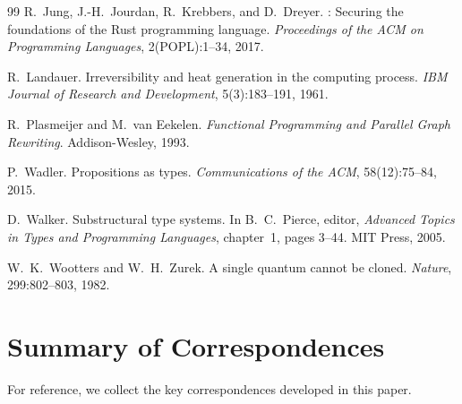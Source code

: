 \documentclass[11pt,a4paper]{article}
\begin{document}
\begin{thebibliography}{99}
R.~Jung, J.-H.~Jourdan, R.~Krebbers, and D.~Dreyer.
: Securing the foundations of the {Rust} programming
  language.
\newblock \emph{Proceedings of the ACM on Programming Languages}, 2(POPL):1--34,
  2017.

R.~Landauer.
\newblock Irreversibility and heat generation in the computing process.
\newblock \emph{IBM Journal of Research and Development}, 5(3):183--191, 1961.

R.~Plasmeijer and M.~van Eekelen.
\newblock \emph{Functional Programming and Parallel Graph Rewriting}.
\newblock Addison-Wesley, 1993.

P.~Wadler.
\newblock Propositions as types.
\newblock \emph{Communications of the ACM}, 58(12):75--84, 2015.

D.~Walker.
\newblock Substructural type systems.
\newblock In B.~C.~Pierce, editor, \emph{Advanced Topics in Types and
  Programming Languages}, chapter~1, pages 3--44. MIT Press, 2005.

W.~K.~Wootters and W.~H.~Zurek.
\newblock A single quantum cannot be cloned.
\newblock \emph{Nature}, 299:802--803, 1982.

\end{thebibliography}

\appendix

\section{Summary of Correspondences}
\label{app:correspondences}

For reference, we collect the key correspondences developed in this
paper.
\end{document}

